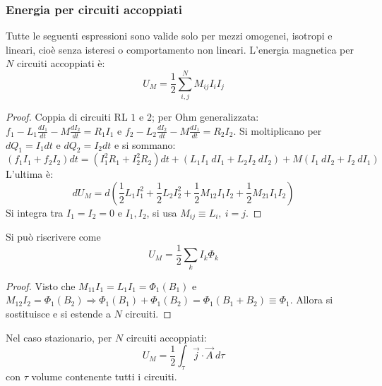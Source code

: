 \documentclass[a4paper]{scrartcl}
\numberwithin{equation}{subsection}
\theoremstyle{style1}
\newenvironment{boxenv}[1][]{
    \begin{eqbox}[#1]
    }{
   \end{eqbox}
}
\begin{document}
\subsubsection{Energia per circuiti accoppiati}
Tutte le seguenti espressioni sono valide solo per mezzi omogenei, isotropi e lineari, cio\`e senza isteresi o comportamento non lineari. L'energia magnetica per $N$ circuiti accoppiati \`e:
\begin{equation}
	U_M = \frac{1}{2}\sum_{i,j}^{N} M_{ij} I_i I_j
\end{equation}
\begin{boxenv}[]
\begin{proof}
	Coppia di circuiti RL $1$ e $2$; per Ohm generalizzata: $f_1 - L_1 \frac{d I_1}{d t} - M \frac{d I_2}{d t} = R_1 I_1$ e $f_2-L_2 \frac{d I_2}{d t}  - M \frac{d I_1}{d t} = R_2I_2$. Si moltiplicano per $dQ_1 = I_1dt$ e $dQ_2 = I_2dt$ e si sommano:
		\[
			(f_1I_1+f_2I_2) dt = (I_1^2 R_1 + I_2^2R_2) dt + (L_1I_1 \ dI_1 + L_2I_2\ dI_2) + M (I_1\ dI_2+I_2\ dI_1)
		\] 
		 L'ultima \`e:
		\begin{equation}
			dU_M = d \left(\frac{1}{2}L_1I_1^2 + \frac{1}{2}L_2I_2^2 + \frac{1}{2}M_{12}I_1I_2 + \frac{1}{2}M_{21}I_1I_2\right) 
		\end{equation}
		Si integra tra $I_1=I_2=0$ e $I_1,I_2$, si usa $M_{ij} \equiv L_i, \ i=j$.
	\end{proof}
\end{boxenv}
\noindent Si pu\`o riscrivere come
\begin{equation}
	U_M = \frac{1}{2}\sum_{k}^{} I_k\Phi_k
\end{equation}
\begin{boxenv}[]
\begin{proof}
	Visto che $M_{11}I_1=L_1I_1=\Phi_1(B_1)$ e $M_{12}I_2=\Phi_1(B_2)\Rightarrow \Phi_1(B_1)+\Phi_1(B_2) = \Phi_1(B_1+B_2)\equiv \Phi_1$. Allora si sostituisce e si estende a $N$ circuiti.
\end{proof}
\end{boxenv}
\noindent Nel caso stazionario, per $N$ circuiti accoppiati:
\begin{equation}
	U_M = \frac{1}{2} \int_{\tau } \vec{j}\cdot \vec{A}\ d\tau 
\end{equation}
con $\tau $ volume contenente tutti i circuiti.
\end{document}
